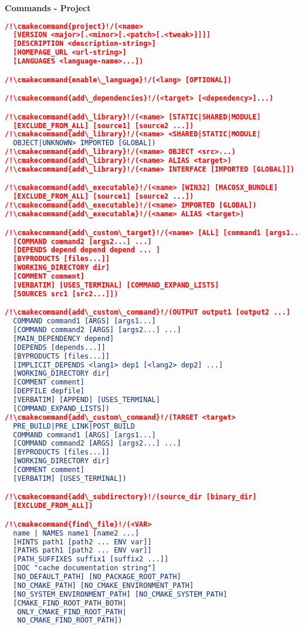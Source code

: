 \documentclass{article}
\newcommand{\cmakecommand}[1]{{\href{https://cmake.org/cmake/help/v3.20/command/#1.html}{#1}}}
\begin{document}
\begin{minipage}[t]{0.18\linewidth}
\textbf{Commands - Project}
\begin{lstlisting}[language=CMake]
/!\cmakecommand{project}!/(<name>
  [VERSION <major>[.<minor>[.<patch>[.<tweak>]]]]
  [DESCRIPTION <description-string>]
  [HOMEPAGE_URL <url-string>]
  [LANGUAGES <language-name>...])

/!\cmakecommand{enable\_language}!/(<lang> [OPTIONAL])

/!\cmakecommand{add\_dependencies}!/(<target> [<dependency>]...)

/!\cmakecommand{add\_library}!/(<name> [STATIC|SHARED|MODULE]
  [EXCLUDE_FROM_ALL] [source1] [source2 ...])
/!\cmakecommand{add\_library}!/(<name> <SHARED|STATIC|MODULE|
  OBJECT|UNKNOWN> IMPORTED [GLOBAL])
/!\cmakecommand{add\_library}!/(<name> OBJECT <src>...)
/!\cmakecommand{add\_library}!/(<name> ALIAS <target>)
/!\cmakecommand{add\_library}!/(<name> INTERFACE [IMPORTED [GLOBAL]])

/!\cmakecommand{add\_executable}!/(<name> [WIN32] [MACOSX_BUNDLE]
  [EXCLUDE_FROM_ALL] [source1] [source2 ...])
/!\cmakecommand{add\_executable}!/(<name> IMPORTED [GLOBAL])
/!\cmakecommand{add\_executable}!/(<name> ALIAS <target>)

/!\cmakecommand{add\_custom\_target}!/(<name> [ALL] [command1 [args1...]]
  [COMMAND command2 [args2...] ...]
  [DEPENDS depend depend depend ... ]
  [BYPRODUCTS [files...]]
  [WORKING_DIRECTORY dir]
  [COMMENT comment]
  [VERBATIM] [USES_TERMINAL] [COMMAND_EXPAND_LISTS]
  [SOURCES src1 [src2...]])

/!\cmakecommand{add\_custom\_command}!/(OUTPUT output1 [output2 ...]
  COMMAND command1 [ARGS] [args1...]
  [COMMAND command2 [ARGS] [args2...] ...]
  [MAIN_DEPENDENCY depend]
  [DEPENDS [depends...]]
  [BYPRODUCTS [files...]]
  [IMPLICIT_DEPENDS <lang1> dep1 [<lang2> dep2] ...]
  [WORKING_DIRECTORY dir]
  [COMMENT comment]
  [DEPFILE depfile]
  [VERBATIM] [APPEND] [USES_TERMINAL]
  [COMMAND_EXPAND_LISTS])
/!\cmakecommand{add\_custom\_command}!/(TARGET <target>
  PRE_BUILD|PRE_LINK|POST_BUILD
  COMMAND command1 [ARGS] [args1...]
  [COMMAND command2 [ARGS] [args2...] ...]
  [BYPRODUCTS [files...]]
  [WORKING_DIRECTORY dir]
  [COMMENT comment]
  [VERBATIM] [USES_TERMINAL])

/!\cmakecommand{add\_subdirectory}!/(source_dir [binary_dir]
  [EXCLUDE_FROM_ALL])

/!\cmakecommand{find\_file}!/(<VAR>
  name | NAMES name1 [name2 ...]
  [HINTS path1 [path2 ... ENV var]]
  [PATHS path1 [path2 ... ENV var]]
  [PATH_SUFFIXES suffix1 [suffix2 ...]]
  [DOC "cache documentation string"]
  [NO_DEFAULT_PATH] [NO_PACKAGE_ROOT_PATH]
  [NO_CMAKE_PATH] [NO_CMAKE_ENVIRONMENT_PATH]
  [NO_SYSTEM_ENVIRONMENT_PATH] [NO_CMAKE_SYSTEM_PATH]
  [CMAKE_FIND_ROOT_PATH_BOTH|
   ONLY_CMAKE_FIND_ROOT_PATH|
   NO_CMAKE_FIND_ROOT_PATH])


\end{lstlisting}
\end{minipage}
\end{document}
